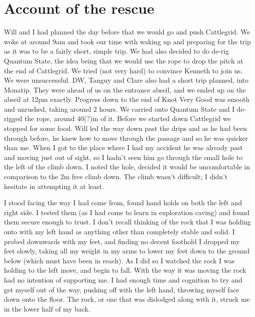 \section{Account of the rescue}

    Will and I had planned the day before that we would go and push Cattlegrid. We woke at around 9am and took our time with waking up and preparing for the trip as it was to be a fairly short, simple trip. We had also decided to do de-rig Quantum State, the idea being that we would use the rope to drop the pitch at the end of Cattlegrid. We tried (not very hard) to convince Kenneth to join us. We were unsuccessful. DW, Tanguy and Clare also had a short trip planned, into Monatip. They were ahead of us on the entrance abseil, and we ended up on the abseil at 12pm exactly. Progress down to the end of Knot Very Good was smooth and unrushed, taking around 2 hours. We carried onto Quantum State and I de-rigged the rope, around 40(?)m of it. Before we started down Cattlegrid we stopped for some food. Will led the way down past the drips and as he had been through before, he knew how to move through the passage and so he was quicker than me. When I got to the place where I had my accident he was already past and moving just out of sight, so I hadn’t seen him go through the small hole to the left of the climb down. I noted the hole, decided it
    would be uncomfortable in comparison to the 2m free climb down. The climb wasn’t difficult; I didn’t hesitate in attempting it at least.

    I stood facing the way I had come from, found hand holds on both the left and right side. I tested them (as I had come to learn in exploration caving) and found them secure enough to trust. I don’t recall thinking of the rock that I was holding onto with my left hand as anything other than completely stable and solid. I probed downwards with my feet, and finding no decent foothold I dropped my feet slowly, taking all my weight in my arms to lower my feet down to the ground below (which must have been in reach). As I did so I watched the rock I was holding to the left move, and begin to fall. With the way it was moving the rock had no intention of supporting me. I had enough time and cognition to try and get myself out of the way, pushing off with the left hand, throwing myself face down onto the floor. The rock, or one that was dislodged along with it, struck me in the lower half of my back. 

